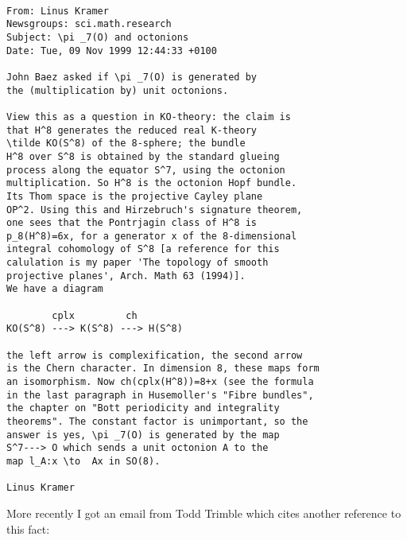 \begin{verbatim}

From: Linus Kramer 
Newsgroups: sci.math.research
Subject: \pi _7(O) and octonions
Date: Tue, 09 Nov 1999 12:44:33 +0100

John Baez asked if \pi _7(O) is generated by
the (multiplication by) unit octonions.

View this as a question in KO-theory: the claim is
that H^8 generates the reduced real K-theory
\tilde KO(S^8) of the 8-sphere; the bundle
H^8 over S^8 is obtained by the standard glueing
process along the equator S^7, using the octonion
multiplication. So H^8 is the octonion Hopf bundle.
Its Thom space is the projective Cayley plane
OP^2. Using this and Hirzebruch's signature theorem,
one sees that the Pontrjagin class of H^8 is
p_8(H^8)=6x, for a generator x of the 8-dimensional
integral cohomology of S^8 [a reference for this
calulation is my paper 'The topology of smooth
projective planes', Arch. Math 63 (1994)].
We have a diagram

        cplx         ch
KO(S^8) ---> K(S^8) ---> H(S^8)

the left arrow is complexification, the second arrow
is the Chern character. In dimension 8, these maps form
an isomorphism. Now ch(cplx(H^8))=8+x (see the formula
in the last paragraph in Husemoller's "Fibre bundles",
the chapter on "Bott periodicity and integrality
theorems". The constant factor is unimportant, so the
answer is yes, \pi _7(O) is generated by the map
S^7---> O which sends a unit octonion A to the
map l_A:x \to  Ax in SO(8).

Linus Kramer

\end{verbatim}
    

More recently I got an 
email from Todd Trimble which cites another reference
to this fact:


